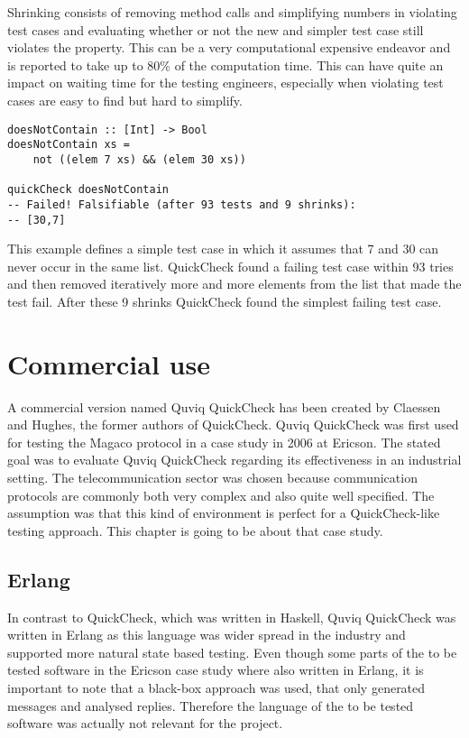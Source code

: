 \documentclass[a4paper, 12pt]{article} %
\begin{document}
Shrinking consists of removing method calls and simplifying numbers in violating test cases and evaluating whether or not the new and simpler test case still violates the property. This can be a very computational expensive endeavor and is reported to take up to 80\% of the computation time. This can have quite an impact on waiting time for the testing engineers, especially when violating test cases are easy to find but hard to simplify. \cite{Hughes:2016}

\begin{verbatim}
doesNotContain :: [Int] -> Bool
doesNotContain xs = 
    not ((elem 7 xs) && (elem 30 xs))

quickCheck doesNotContain
-- Failed! Falsifiable (after 93 tests and 9 shrinks):
-- [30,7]
\end{verbatim}

This example defines a simple test case in which it assumes that 7 and 30 can never occur in the same list. QuickCheck found a failing test case within 93 tries and then removed iteratively more and more elements from the list that made the test fail. After these 9 shrinks QuickCheck found the simplest failing test case.

\newpage
\section{Commercial use}

A commercial version named Quviq QuickCheck has been created by Claessen and Hughes, the former authors of QuickCheck. Quviq QuickCheck was first used for testing the Magaco protocol in a case study in 2006 at Ericson. The stated goal was to evaluate Quviq QuickCheck regarding its effectiveness in an industrial setting. The telecommunication sector was chosen because communication protocols are commonly both very complex and also quite well specified. The assumption was that this kind of environment is perfect for a QuickCheck-like testing approach. This chapter is going to be about that case study. \cite{Arts06}

\subsection{Erlang}

In contrast to QuickCheck, which was written in Haskell, Quviq QuickCheck was written in Erlang as this language was wider spread in the industry and supported more natural state based testing. Even though some parts of the to be tested software in the Ericson case study where also written in Erlang, it is important to note that a black-box approach was used, that only generated messages and analysed replies. Therefore the language of the to be tested software was actually not relevant for the project. \cite{Arts06} 
\end{document}
